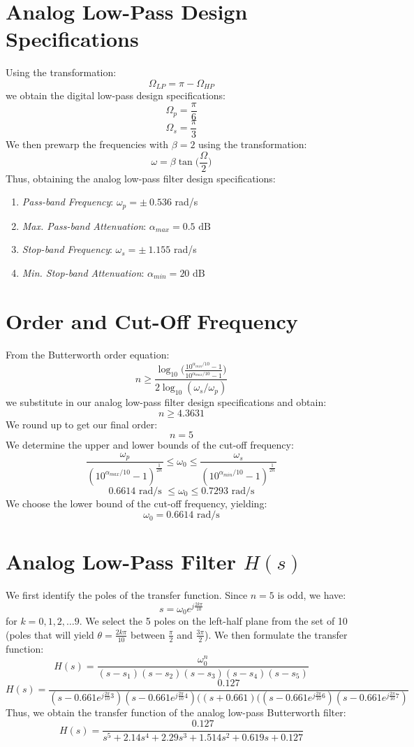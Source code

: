 \documentclass{article}
\begin{document}
\section{Analog Low-Pass Design Specifications}
Using the transformation:
\[
\Omega_{LP}=\pi-\Omega_{HP}
\]
we obtain the digital low-pass design specifications:
\[
\Omega_p=\frac{\pi}{6}
\]
\[
\Omega_s=\frac{\pi}{3}
\]
We then prewarp the frequencies with \(\beta=2\) using the transformation:
\[
\omega=\beta\tan\bigg(\frac{\Omega}{2}\bigg)
\]
Thus, obtaining the analog low-pass filter design specifications:
\begin{enumerate}[label=\alph*.,leftmargin=2cm, rightmargin=2cm]
    \item \textit{Pass-band Frequency}: \hfill \(\omega_p=\pm\ 0.536\) rad/s
    \item \textit{Max. Pass-band Attenuation}: \hfill \(\alpha_{max}=0.5\text{ dB}\)
    \item \textit{Stop-band Frequency}: \hfill \(\omega_s=\pm\ 1.155\) rad/s
    \item \textit{Min. Stop-band Attenuation}: \hfill \(\alpha_{min}=20\text{ dB}\)
\end{enumerate}

\section{Order and Cut-Off Frequency}
From the Butterworth order equation:
\[
n\geq\frac{\log_{10}(\frac{10^{\alpha_{min}/10}-1}{10^{\alpha_{max}/10}-1}\big)}{2\log_{10}(\omega_s/\omega_p)}
\]
we substitute in our analog low-pass filter design specifications and obtain:
\[
n\geq4.3631
\]
We round up to get our final order:
\[
n=5
\]
We determine the upper and lower bounds of the cut-off frequency:
\[
\frac{\omega_p}{(10^{\alpha_{max}/10}-1)^{\frac{1}{2n}}}\leq\omega_0\leq\frac{\omega_s}{(10^{\alpha_{min}/10}-1)^{\frac{1}{2n}}}
\]
\[
0.6614 \text{ rad/s }\leq\omega_0\leq0.7293 \text{ rad/s}
\]
We choose the lower bound of the cut-off frequency, yielding:
\[
\omega_0=0.6614\text{ rad/s}
\]

\section{Analog Low-Pass Filter \(H(s)\)}
We first identify the poles of the transfer function. Since \(n=5\) is odd, we have:
\[
s=\omega_0e^{j\frac{2k\pi}{10}}
\]
for \(k=0, 1, 2,\dots9\). We select the 5 poles on the left-half plane from the set of 10 (poles that will yield \(\theta=\frac{2k\pi}{10}\) between \(\frac{\pi}{2}\) and \(\frac{3\pi}{2}\)). We then formulate the transfer function:
\[
H(s)=\frac{\omega_0^n}{(s-s_1)(s-s_2)(s-s_3)(s-s_4)(s-s_5)}
\]
\[
H(s)=\frac{0.127}{(s-0.661e^{j\frac{2\pi}{10}3})(s-0.661e^{j\frac{2\pi}{10}4})((s+0.661)((s-0.661e^{j\frac{2\pi}{10}6})(s-0.661e^{j\frac{2\pi}{10}7})}
\]
Thus, we obtain the transfer function of the analog low-pass Butterworth filter:
\[
H(s)=\frac{0.127}{s^5+2.14s^4+2.29s^3+1.514s^2+0.619s+0.127}
\]
\end{document}
